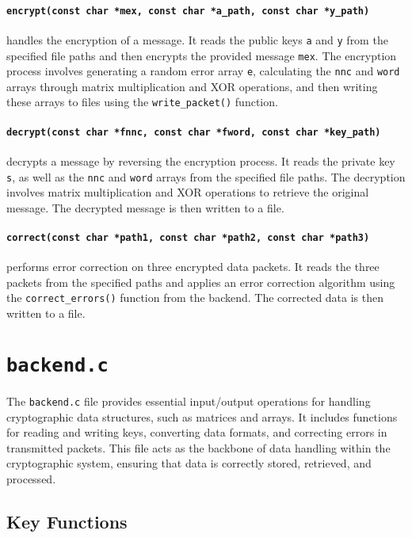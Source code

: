 \paragraph{\texttt{encrypt(const char *mex, const char *a\_path, const char *y\_path)}}
handles the encryption of a message. It reads the public keys \texttt{a} and \texttt{y} from the specified file paths and then encrypts the provided message \texttt{mex}. The encryption process involves generating a random error array \texttt{e}, calculating the \texttt{nnc} and \texttt{word} arrays through matrix multiplication and XOR operations, and then writing these arrays to files using the \texttt{write\_packet()} function.

\paragraph{\texttt{decrypt(const char *fnnc, const char *fword, const char *key\_path)}}
decrypts a message by reversing the encryption process. It reads the private key \texttt{s}, as well as the \texttt{nnc} and \texttt{word} arrays from the specified file paths. The decryption involves matrix multiplication and XOR operations to retrieve the original message. The decrypted message is then written to a file.

\paragraph{\texttt{correct(const char *path1, const char *path2, const char *path3)}}
performs error correction on three encrypted data packets. It reads the three packets from the specified paths and applies an error correction algorithm using the \texttt{correct\_errors()} function from the backend. The corrected data is then written to a file.

\section{\texttt{backend.c}}

The \texttt{backend.c} file provides essential input/output operations for handling cryptographic data structures, such as matrices and arrays. It includes functions for reading and writing keys, converting data formats, and correcting errors in transmitted packets. This file acts as the backbone of data handling within the cryptographic system, ensuring that data is correctly stored, retrieved, and processed.

\subsection{Key Functions}


